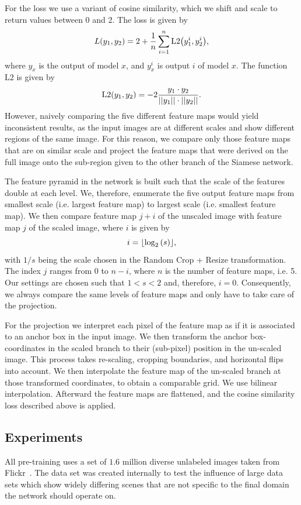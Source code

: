 For the loss we use a variant of cosine similarity, which we shift and scale to return values between 0 and 2. The loss is given by
\begin{equation}
L{\left( y_1, y_2 \right)} = 2 + \frac{1}{n}\sum_{i=1}^n\text{L2}{\left( y_1^i, y_2^i \right)},
\end{equation}
where $y_x$ is the output of model $x$, and $y_x^i$ is output $i$ of model $x$. The function L2 is given by
\begin{equation}
\text{L2}{\left( y_1, y_2 \right)} = -2\frac{y_1\cdot y_2}{{\left|\left| y_1 \right|\right|}\cdot{\left|\left| y_2 \right|\right|}}.
\end{equation}
However, naively comparing the five different feature maps would yield inconsistent results, as the input images are at different scales and show different regions of the same image. For this reason, we compare only those feature maps that are on similar scale and project the feature maps that were derived on the full image onto the sub-region given to the other branch of the Siamese network.

The feature pyramid in the network is built such that the scale of the features double at each level. We, therefore, enumerate the five output feature maps from smallest scale (i.e. largest feature map) to largest scale (i.e. smallest feature map). We then compare feature map $j+i$ of the unscaled image with feature map $j$ of the scaled image, where $i$ is given by
\begin{equation}
i=\lfloor\log_2{\left( s \right)}\rfloor,
\end{equation}
with $1/s$ being the scale chosen in the Random Crop + Resize transformation. The index $j$ ranges from $0$ to $n-i$, where $n$ is the number of feature maps, i.e. 5. Our settings are chosen such that $1<s<2$ and, therefore, $i=0$. Consequently, we always compare the same levels of feature maps and only have to take care of the projection.

For the projection we interpret each pixel of the feature map as if it is associated to an anchor box in the input image. We then transform the anchor box-coordinates in the scaled branch to their (sub-pixel) position in the un-scaled image. This process takes re-scaling, cropping boundaries, and horizontal flips into account. We then interpolate the feature map of the un-scaled branch at those transformed coordinates, to obtain a comparable grid. We use bilinear interpolation. Afterward the feature maps are flattened, and the cosine similarity loss described above is applied.

\subsection{Experiments}
All pre-training uses a set of $1.6$ million diverse unlabeled images taken from Flickr~\cite{Flickr:2022aaa}. The data set was created internally to test the influence of large data sets which show widely differing scenes that are not specific to the final domain the network should operate on.

